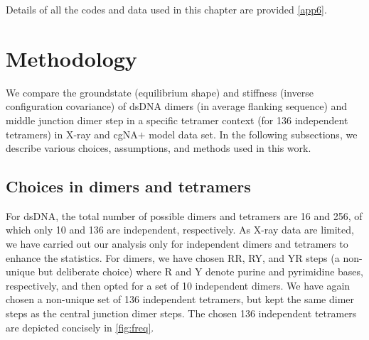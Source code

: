 Details of all the codes and data used in this chapter are provided \cref{app6}. 

\section{Methodology} \label{s:method}
We compare the groundstate (equilibrium shape) and stiffness (inverse configuration covariance) of dsDNA dimers (in average flanking sequence)
and middle junction dimer step in a specific tetramer context 
(for 136 independent tetramers) in X-ray and cgNA$+$ model data set.
In the following subsections, we describe various choices, assumptions, and methods used in this work.
\subsection{Choices in dimers and tetramers}\label{ss:choices} %
For dsDNA, the total number of possible dimers and tetramers are 16 and 256, of which only 10 and 136 are independent, respectively. 
As X-ray data are limited, we have carried out our analysis
only for independent dimers and tetramers to enhance the statistics.
For dimers, we have chosen RR, RY, and YR steps (a non-unique but deliberate choice) where R and Y denote purine
and pyrimidine bases, respectively, and then opted for a set of 10 independent dimers.
We have again chosen a non-unique set of 136 independent tetramers, but kept the same dimer steps as the central junction dimer steps.
The chosen 136 independent tetramers are depicted concisely in \cref{fig:freq}.


